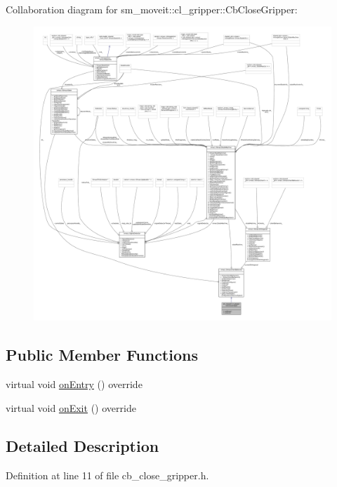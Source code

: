 Collaboration diagram for sm\+\_\+moveit\+:\+:cl\+\_\+gripper\+:\+:Cb\+Close\+Gripper\+:
\nopagebreak
\begin{figure}[H]
\begin{center}
\leavevmode
\includegraphics[width=350pt]{classsm__moveit_1_1cl__gripper_1_1CbCloseGripper__coll__graph}
\end{center}
\end{figure}
\subsection*{Public Member Functions}
\begin{DoxyCompactItemize}
\item 
virtual void \hyperlink{classsm__moveit_1_1cl__gripper_1_1CbCloseGripper_adc772dda477c6370dc41117613e35699}{on\+Entry} () override
\item 
virtual void \hyperlink{classsm__moveit_1_1cl__gripper_1_1CbCloseGripper_a643cca41b7a62a3c2b26e07ab7edb05a}{on\+Exit} () override
\end{DoxyCompactItemize}


\subsection{Detailed Description}


Definition at line 11 of file cb\+\_\+close\+\_\+gripper.\+h.



